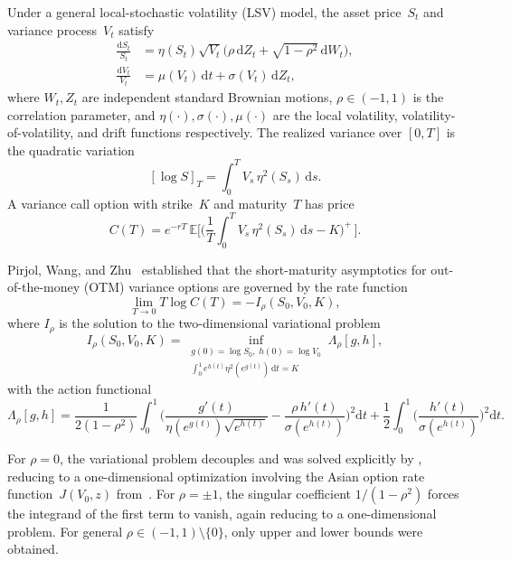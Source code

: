 \documentclass[12pt]{article}
\newcommand{\E}{\mathbb{E}}
\newcommand{\dd}{\mathrm{d}}
\begin{document}
Under a general local-stochastic volatility (LSV) model, the asset price~$S_t$ and
variance process~$V_t$ satisfy
\begin{align}
\frac{\dd S_t}{S_t} &= \eta(S_t)\sqrt{V_t}\bigl(\rho\,\dd Z_t
  + \sqrt{1-\rho^2}\,\dd W_t\bigr), \label{eq:S} \\
\frac{\dd V_t}{V_t} &= \mu(V_t)\,\dd t + \sigma(V_t)\,\dd Z_t, \label{eq:V}
\end{align}
where $W_t,Z_t$ are independent standard Brownian motions, $\rho\in(-1,1)$ is the
correlation parameter, and $\eta(\cdot),\sigma(\cdot),\mu(\cdot)$ are the local volatility,
volatility-of-volatility, and drift functions respectively. The realized variance over
$[0,T]$ is the quadratic variation
\begin{equation}\label{eq:RV}
[{\log S}]_T = \int_0^T V_s\,\eta^2(S_s)\,\dd s.
\end{equation}
A variance call option with strike~$K$ and maturity~$T$ has price
\begin{equation}\label{eq:Cprice}
C(T) = e^{-rT}\,\E\biggl[\biggl(\frac{1}{T}\int_0^T V_s\,\eta^2(S_s)\,\dd s
  - K\biggr)^{\!+}\,\biggr].
\end{equation}

Pirjol, Wang, and Zhu~\cite{PWZ2025} established that the short-maturity asymptotics
for out-of-the-money (OTM) variance options are governed by the rate function
\begin{equation}\label{eq:Irho}
\lim_{T\to 0} T\log C(T) = -I_\rho(S_0,V_0,K),
\end{equation}
where $I_\rho$ is the solution to the two-dimensional variational problem
\begin{equation}\label{eq:varprob}
I_\rho(S_0,V_0,K) = \inf_{\substack{g(0)=\log S_0,\;h(0)=\log V_0 \\
  \int_0^1 e^{h(t)}\eta^2(e^{g(t)})\,\dd t = K}} \Lambda_\rho[g,h],
\end{equation}
with the action functional
\begin{equation}\label{eq:action}
\Lambda_\rho[g,h] = \frac{1}{2(1-\rho^2)}\int_0^1
  \biggl(\frac{g'(t)}{\eta(e^{g(t)})\sqrt{e^{h(t)}}}
  - \frac{\rho\,h'(t)}{\sigma(e^{h(t)})}\biggr)^{\!2}\dd t
  + \frac{1}{2}\int_0^1\biggl(\frac{h'(t)}{\sigma(e^{h(t)})}\biggr)^{\!2}\dd t.
\end{equation}

For $\rho=0$, the variational problem decouples and was solved explicitly by
\cite{PWZ2025}, reducing to a one-dimensional optimization involving the Asian option
rate function~$J(V_0,z)$ from~\cite{PZ2023}. For $\rho=\pm 1$, the singular coefficient
$1/(1-\rho^2)$ forces the integrand of the first term to vanish, again reducing to a
one-dimensional problem. For general $\rho\in(-1,1)\setminus\{0\}$, only upper and lower
bounds were obtained.
\end{document}

